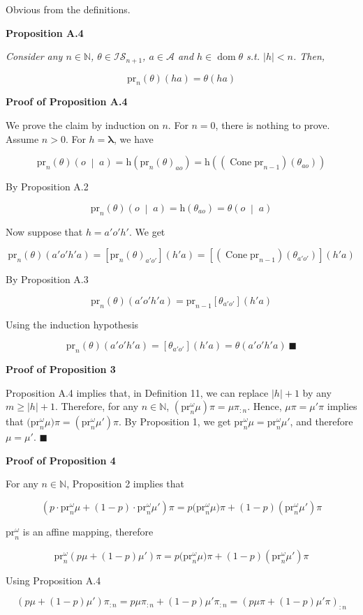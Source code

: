 \documentclass[a4paper]{article}
\newcommand{\Co}[1]{}
\DeclareMathOperator{\Dom}{dom}
\newcommand{\AP}[1]{\left(#1\right)}
\newcommand{\AB}[1]{\left[#1\right]}
\newcommand{\APM}[2]{\left(#1\;\middle\vert\;#2\right)}
\newcommand{\Abs}[1]{\left\vert #1 \right\vert}
\newcommand{\Nats}{\mathbb{N}}
\newcommand{\Estr}{\boldsymbol{\lambda}} %
\newcommand{\A}{\mathcal{A}}
\DeclareMathOperator{\Cone}{Cone}
\newcommand{\Ht}{\mathrm{h}}
\newcommand{\IS}{\mathcal{IS}}
\newcommand{\Prj}{\mathrm{pr}}
\newcommand{\Prjo}{\mathrm{pr}^\omega_n}
\begin{document}
Obvious from the definitions.

\textbf{Proposition A.4}\Co{b}

\textit{Consider any $n\in\Nats$, $\theta\in\IS_{n+1}$, $a\in\A$ and $h\in\Dom\theta$ s.t. $\Abs{h}< n$. Then,}\Co{i} 

$$\Prj_n(\theta)(ha)=\theta(ha)$$

\textbf{Proof of Proposition A.4}\Co{b}

We prove the claim by induction on $n$. For $n=0$, there is nothing to prove. Assume $n>0$. For $h=\Estr$, we have

$$\Prj_n(\theta)\APM{o}{a}=\Ht\AP{\Prj_n(\theta)_{ao}}=\Ht\AP{\AP{\Cone\Prj_{n-1}}\AP{\theta_{ao}}}$$

By Proposition A.2

$$\Prj_n(\theta)\APM{o}{a}=\Ht\AP{\theta_{ao}}=\theta\APM{o}{a}$$

Now suppose that $h=a'o'h'$. We get

$$\Prj_n(\theta)\AP{a'o'h'a}=\AB{\Prj_n(\theta)_{a'o'}}\AP{h'a}=\AB{\AP{\Cone\Prj_{n-1}}\AP{\theta_{a'o'}}}\AP{h'a}$$

By Proposition A.3

$$\Prj_n(\theta)\AP{a'o'h'a}=\Prj_{n-1}\AB{\theta_{a'o'}}\AP{h'a}$$

Using the induction hypothesis

$$\Prj_n(\theta)\AP{a'o'h'a}=\AB{\theta_{a'o'}}\AP{h'a}=\theta\AP{a'o'h'a}\ \blacksquare$$

\textbf{Proof of Proposition 3}\Co{b}

Proposition A.4 implies that, in Definition 11, we can replace $\Abs{h}+1$ by any $m\geq\Abs{h}+1$. Therefore, for any $n\in\Nats$, $\AP{\Prjo\mu}\pi=\mu\pi_{:n}$. Hence, $\mu\pi=\mu'\pi$ implies that $\big(\Prjo\mu\big)\pi=\AP{\Prjo\mu'}\pi$. By Proposition 1, we get $\Prjo\mu=\Prjo\mu'$, and therefore $\mu=\mu'$. $\blacksquare$

\textbf{Proof of Proposition 4}\Co{b}

For any $n\in\Nats$, Proposition 2 implies that

$$\AP{p\cdot\Prjo\mu+(1-p)\cdot\Prjo\mu'}\pi=p\big(\Prjo\mu\big)\pi+(1-p)\AP{\Prjo\mu'}\pi$$

$\Prjo$ is an affine mapping, therefore

$$\Prjo\AP{p\mu+(1-p)\mu'}\pi=p\big(\Prjo\mu\big)\pi+(1-p)\AP{\Prjo\mu'}\pi$$

Using Proposition A.4

$$\AP{p\mu+(1-p)\mu'}\pi_{:n}=p\mu\pi_{:n}+(1-p)\mu'\pi_{:n}=\AP{p\mu\pi+(1-p)\mu'\pi}_{:n}$$
\end{document}
